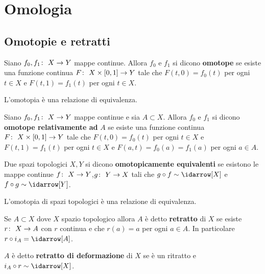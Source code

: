 \chapter{Omologia}


\section{Omotopie e retratti}

\begin{definition}
	Siano $f_0, f_1 \colon\ X \rightarrow Y$ mappe continue. Allora $f_0$ e $f_1$ si dicono \textbf{omotope} se esiste una funzione continua $F \colon\ X \times \left[0,1\right] \rightarrow Y$ tale che $F(t,0) = f_0(t)$ per ogni $t \in X$ e $F(t,1) = f_1(t)$ per ogni $t \in X$.
\end{definition}

\begin{remark}
	L'omotopia è una relazione di equivalenza. 
\end{remark}

\begin{definition}
	Siano $f_0, f_1 \colon\ X \rightarrow Y$ mappe continue e sia $A \subset X$. Allora $f_0$ e $f_1$ si dicono \textbf{omotope relativamente ad} $A$ se esiste una funzione continua $F \colon\ X \times \left[0,1\right] \rightarrow Y$ tale che $F(t,0) = f_0(t)$ per ogni $t \in X$ e $F(t,1) = f_1(t)$ per ogni $t \in X$ e $F(a, t) = f_0(a) = f_1(a)$ per ogni $a \in A$.
\end{definition}

\begin{definition}
	Due spazi topologici $X,Y$ si dicono \textbf{omotopicamente equivalenti} se esistono le mappe continue $f \colon\ X \rightarrow Y$,$g \colon\ Y \rightarrow X$ tali che $g \circ f \sim \idarrow[X]$ e $f \circ g \sim \idarrow[Y]$. 
\end{definition}

\begin{remark}
	L'omotopia di spazi topologici è una relazione di equivalenza. 
\end{remark}

\begin{definition}
	Se $A \subset X$ dove $X$ spazio topologico allora $A$ è detto \textbf{retratto} di $X$ se esiste $r \colon\ X \rightarrow A$ con $r$ continua e che $r(a) = a$ per ogni $a \in A$. In particolare $r \circ i_A = \idarrow[A]$.
\end{definition}

\begin{definition}
	$A$ è detto \textbf{retratto di deformazione} di $X$ se è un ritratto e $i_A \circ r \sim \idarrow[X]$.
\end{definition}


